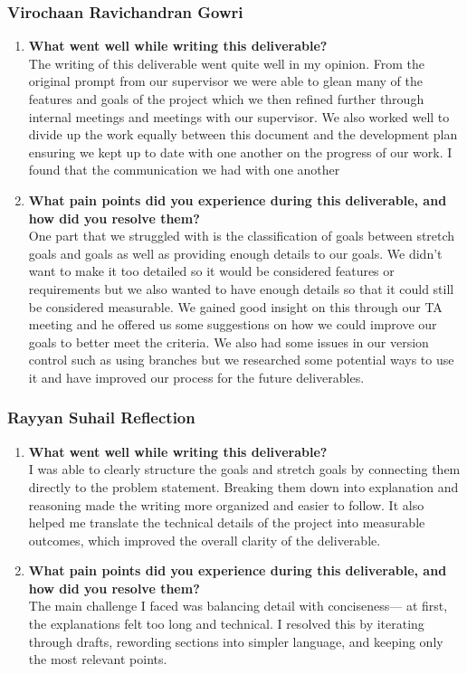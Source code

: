 \documentclass{article}
\begin{document}
\subsubsection*{Virochaan Ravichandran Gowri}
\begin{enumerate}
    \item \textbf{What went well while writing this deliverable? } \\
    The writing of this deliverable went quite well in my opinion. From the original prompt from our supervisor we were able to glean many of the features and goals of the project which we then refined further through internal meetings and meetings with our supervisor. We also worked well to divide up the work equally between this document and the development plan ensuring we kept up to date with one another on the progress of our work. I found that the communication we had with one another
    \item \textbf{What pain points did you experience during this deliverable, and how did you resolve them?} \\
    One part that we struggled with is the classification of goals between stretch goals and goals as well as providing enough details to our goals. We didn't want to make it too detailed so it would be considered features or requirements but we also wanted to have enough details so that it could still be considered measurable. We gained good insight on this through our TA meeting and he offered us some suggestions on how we could improve our goals to better meet the criteria. We also had some issues in our version control such as using branches but we researched some potential ways to use it and have improved our process for the future deliverables.

\end{enumerate}

\subsubsection*{Rayyan Suhail Reflection}
\begin{enumerate}
    \item \textbf{What went well while writing this deliverable? } \\
    I was able to clearly structure the goals and stretch goals by connecting them directly to the problem statement. Breaking them down into explanation and reasoning made the writing more organized and easier to follow. It also helped me translate the technical details of the project into measurable outcomes, which improved the overall clarity of the deliverable.
    \item \textbf{What pain points did you experience during this deliverable, and how did you resolve them?} \\
    The main challenge I faced was balancing detail with conciseness--- at first, the explanations felt too long and technical. I resolved this by iterating through drafts, rewording sections into simpler language, and keeping only the most relevant points.

\end{enumerate}
\end{document}
